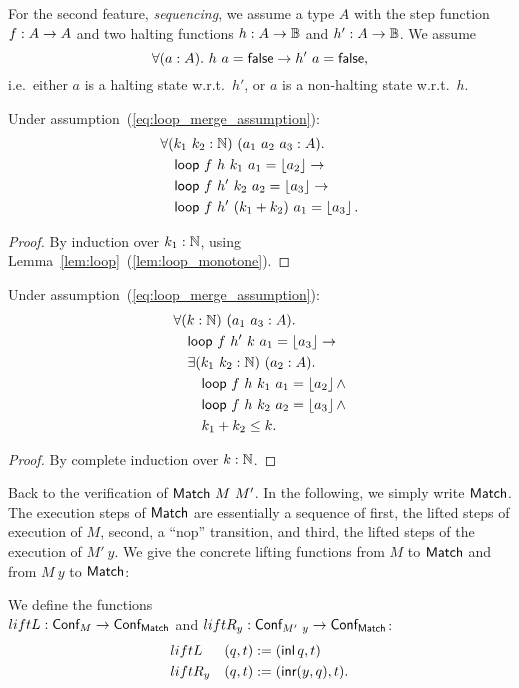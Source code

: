 For the second feature, \emph{sequencing}, we assume a type $A$ with the step function $f : A \rightarrow A$ and two halting functions
$h : A \rightarrow \mathbb{B}$ and $h' : A \rightarrow \mathbb{B}$.  We assume
\begin{equation}
  \label{eq:loop_merge_assumption}
  \forall(a:A).~h~a = \textsf{false} \rightarrow h'~a = \textsf{false},
\end{equation}
i.e.\ either $a$ is a halting state w.r.t.\ $h'$, or $a$ is a non-halting state w.r.t.\ $h$.
\begin{lemma}
  \label{lem:loop_merge}
  Under assumption~(\ref{eq:loop_merge_assumption}):
  \begin{align*}
    & \forall (k_1~k_2:\mathbb{N})~(a_1~a_2~a_3 : A).\\
    & \quad \textsf{loop}~f~h ~k_1      ~a_1 = \left\lfloor {a_2} \right\rfloor \rightarrow\\
    & \quad \textsf{loop}~f~h'~k_2      ~a_2 = \left\lfloor {a_3} \right\rfloor \rightarrow\\
    & \quad \textsf{loop}~f~h'~(k_1+k_2)~a_1 = \left\lfloor {a_3} \right\rfloor.
  \end{align*}
\end{lemma}
\begin{proof}
  By induction over $k_1:\mathbb{N}$, using Lemma~\ref{lem:loop}~(\ref{lem:loop_monotone}).
\end{proof}
\begin{lemma}
  \label{lem:loop_split}
  Under assumption~(\ref{eq:loop_merge_assumption}):
  \begin{align*}
    & \forall (k:\mathbb{N})~(a_1~a_3 : A).\\
    & \quad \textsf{loop}~f~h'~k~a_1 = \left\lfloor {a_3} \right\rfloor \rightarrow \\
    & \quad \exists (k_1~k_2:\mathbb{N})~(a_2:A).\\
    & \quad \quad \textsf{loop}~f~h~k_1~a_1 = \left\lfloor {a_2} \right\rfloor \land\\
    & \quad \quad \textsf{loop}~f~h~k_2~a_2 = \left\lfloor {a_3} \right\rfloor \land\\
    & \quad \quad k_1 + k_2 \leq k.
  \end{align*}
\end{lemma}
\begin{proof}
  By complete induction over $k:\mathbb{N}$.
\end{proof}


Back to the verification of $\textsf{Match}~M~M'$.  In the following, we simply write $\textsf{Match}$.  The execution steps of $\textsf{Match}$ are essentially a sequence of
first, the lifted steps of execution of $M$, second, a ``nop'' transition, and third, the lifted steps of the execution of $M'~y$.  We give the
concrete lifting functions from $M$ to $\textsf{Match}$ and from $M~y$ to $\textsf{Match}$:
\begin{definition}
  We define the functions \\$liftL : \textsf{Conf}_M \rightarrow \textsf{Conf}_{\textsf{Match}}$ and $liftR_y : \textsf{Conf}_{M'~y} \rightarrow \textsf{Conf}_{\textsf{Match}}$:
  \begin{alignat*}{2}
    & liftL   & (q, t) &:= (\operatorname{\textsf{inl}} q,      t) \\
    & liftR_y & (q, t) &:= (\operatorname{\textsf{inr}} (y, q), t).
  \end{alignat*}
\end{definition}

